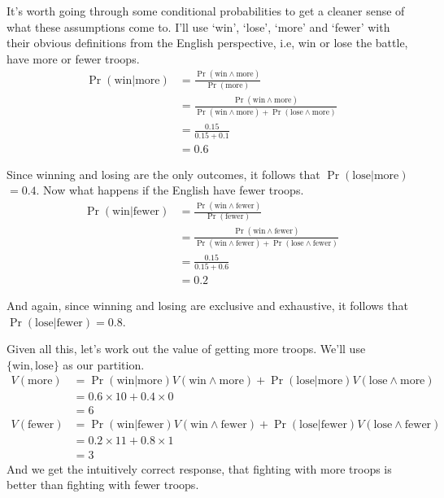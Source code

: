 \noindent It's worth going through some conditional probabilities to get a cleaner sense of what these assumptions come to. I'll use `win', `lose', `more' and `fewer' with their obvious definitions from the English perspective, i.e, win or lose the battle, have more or fewer troops.
\begin{align*}
\Pr(\text{win} | \text{more}) &= \frac{\Pr(\text{win} \wedge \text{more})}{\Pr(\text{more})} \\
 &= \frac{\Pr(\text{win} \wedge \text{more})}{\Pr(\text{win} \wedge \text{more}) + \Pr(\text{lose} \wedge \text{more})} \\
&= \frac{0.15}{0.15 + 0.1} \\
&= 0.6 
\end{align*}

\noindent Since winning and losing are the only outcomes, it follows that $\Pr(\text{lose} | \text{more})$  $= 0.4$. Now what happens if the English have fewer troops.
\begin{align*}
\Pr(\text{win} | \text{fewer}) &= \frac{\Pr(\text{win} \wedge \text{fewer})}{\Pr(\text{fewer})} \\
 &= \frac{\Pr(\text{win} \wedge \text{fewer})}{\Pr(\text{win} \wedge \text{fewer}) + \Pr(\text{lose} \wedge \text{fewer})} \\
&= \frac{0.15}{0.15 + 0.6} \\
&= 0.2 
\end{align*}

\noindent And again, since winning and losing are exclusive and exhaustive, it follows that $\Pr(\text{lose} | \text{fewer}) = 0.8$. 

Given all this, let's work out the value of getting more troops. We'll use $\{\text{win}, \text{lose}\}$ as our partition.
\begin{align*}
V(\text{more}) &= \Pr(\text{win} | \text{more}) V(\text{win} \wedge \text{more}) +  \Pr(\text{lose} | \text{more}) V(\text{lose} \wedge \text{more}) \\
&= 0.6 \times 10 + 0.4 \times 0 \\
&= 6 \\
V(\text{fewer}) &= \Pr(\text{win} | \text{fewer}) V(\text{win} \wedge \text{fewer}) +  \Pr(\text{lose} | \text{fewer}) V(\text{lose} \wedge \text{fewer}) \\
&= 0.2 \times 11 + 0.8 \times 1 \\
&= 3
\end{align*} 
\noindent And we get the intuitively correct response, that fighting with more troops is better than fighting with fewer troops. 

